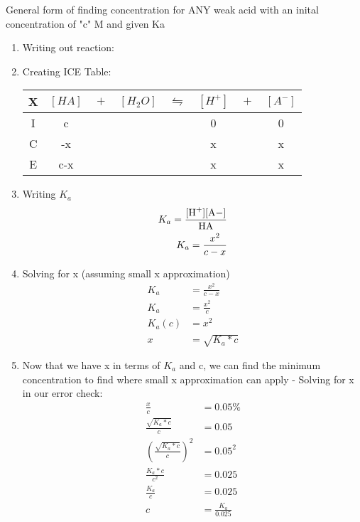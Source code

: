 \documentclass[../CHEM152Notes.tex]{subfiles}
\begin{document}
General form of finding concentration for ANY weak acid with an inital concentration of "c" M and given Ka
\begin{enumerate}
    \item Writing out reaction:
    \item Creating ICE Table: 
    \newline
    \begin{tabular}{c|c@{}c@{}c@{}c@{}c@{}c@{}c}
        \hline
        X   & $[HA]$ & ${}+{}$ & $[H_2O]$ & ${}\leftrightharpoons{}$ & $[H^+]$ & ${}+{}$ & $[A^-]$ \\
        \hline
        I   &  c   &&     &&  0   && 0  \\
        C   &  -x    &&     &&  x   && x  \\
        E   &  c-x &&     &&  x   && x  \\      
    \end{tabular}
    \item Writing $K_a$
    \begin{equation*}
        \begin{aligned}
            K_a = \ce{\frac{[H+][A-]}{HA}} \\
            K_a = \frac{x^2}{c-x}
        \end{aligned}
    \end{equation*}
    \item Solving for x (assuming small x approximation)
    \begin{equation*}
        \begin{aligned}
            K_a &= \frac{x^2}{c-x} \\
            K_a &= \frac{x^2}{c} \\
            K_a(c) &= x^2 \\
            x &= \sqrt{K_a*c}
        \end{aligned}
    \end{equation*}
    \item Now that we have x in terms of $K_a$ and c, we can find the minimum concentration to find where small x approximation can apply - Solving for x in our error check:
    \begin{equation*}
        \begin{aligned}
            \frac{x}{c} &= 0.05\% \\
            \frac{\sqrt{K_a*c}}{c} &= 0.05 \\
            \left(\frac{\sqrt{K_a*c}}{c}\right) ^2&= 0.05^2 \\
            \frac{K_a*c}{c^2} &= 0.025 \\
            \frac{K_a}{c} &= 0.025 \\
            c &= \frac{K_a}{0.025}
        \end{aligned}
    \end{equation*}
\end{enumerate}
\end{document}
